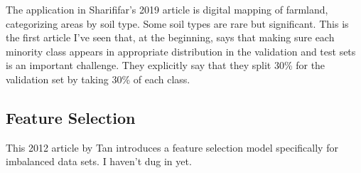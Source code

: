 The application in Sharififar's 2019 article \cite{SHARIFIFAR_2019}  is digital mapping of farmland, categorizing areas by soil type.  Some soil types are rare but significant.  This is the first article I've seen that, at the beginning, says that making sure each minority class appears in appropriate distribution in the validation and test sets is an important challenge.  They explicitly say that they split 30\% for the validation set by taking 30\% of each class.

\subsection{Feature Selection}

This 2012 article by Tan \cite{TAN_2012} introduces a feature selection model specifically for imbalanced data sets.  I haven't dug in yet.  


